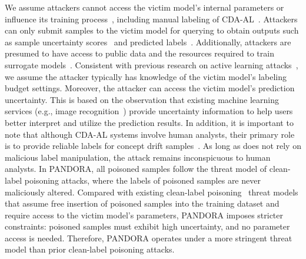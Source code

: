 We assume attackers cannot access the victim model's internal parameters or influence its training process~\cite{2017-ASIACCS-Black-Box-Attack}, including manual labeling of CDA-AL~\cite{2023-Usenix-chenyizhen}.
Attackers can only submit samples to the victim model for querying to obtain outputs such as sample uncertainty scores~\cite{2025-Baidu-Image-Recognition} and predicted labels~\cite{Virustotaluploadinterface}.
Additionally, attackers are presumed to have access to public data and the resources required to train surrogate models~\cite{2023-AAAI-surrogate-model-for-adversarial-attack}.
Consistent with previous research on active learning attacks~\cite{2021-Usenix-active-learning-backdoor}, we assume the attacker typically has knowledge of the victim model's labeling budget settings.
Moreover, the attacker can access the victim model’s prediction uncertainty.
This is based on the observation that existing machine learning services (e.g., image recognition~\cite{2025-Baidu-Image-Recognition}) provide uncertainty information to help users better interpret and utilize the prediction results.
In addition, it is important to note that although CDA-AL systems involve human analysts, their primary role is to provide reliable labels for concept drift samples~\cite{2023-Usenix-chenyizhen}.
As long as \pandora does not rely on malicious label manipulation, the attack remains inconspicuous to human analysts.
In PANDORA, all poisoned samples follow the threat model of clean-label poisoning attacks, where the labels of poisoned samples are never maliciously altered.
Compared with existing clean-label poisoning~\cite{2018-NIPS-Poison-frogs} threat models that assume free insertion of poisoned samples into the training dataset and require access to the victim model’s parameters, PANDORA imposes stricter constraints: poisoned samples must exhibit high uncertainty, and no parameter access is needed.
Therefore, PANDORA operates under a more stringent threat model than prior clean-label poisoning attacks.